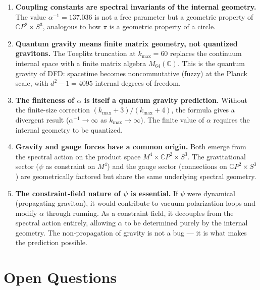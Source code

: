 \documentclass[12pt,a4paper]{article}
\newcommand{\CP}{\mathbb{C}P}
\begin{document}
\begin{enumerate}
\item \textbf{Coupling constants are spectral invariants of the internal geometry.} The value $\alpha^{-1} = 137.036$ is not a free parameter but a geometric property of $\CP^2 \times S^3$, analogous to how $\pi$ is a geometric property of a circle.

\item \textbf{Quantum gravity means finite matrix geometry, not quantized gravitons.} The Toeplitz truncation at $k_{\max} = 60$ replaces the continuum internal space with a finite matrix algebra $M_{64}(\mathbb{C})$. This is the quantum gravity of DFD: spacetime becomes noncommutative (fuzzy) at the Planck scale, with $d^2 - 1 = 4095$ internal degrees of freedom.

\item \textbf{The finiteness of $\alpha$ is itself a quantum gravity prediction.} Without the finite-size correction $(k_{\max}+3)/(k_{\max}+4)$, the formula gives a divergent result ($\alpha^{-1} \to \infty$ as $k_{\max} \to \infty$). The finite value of $\alpha$ requires the internal geometry to be quantized.

\item \textbf{Gravity and gauge forces have a common origin.} Both emerge from the spectral action on the product space $M^4 \times \CP^2 \times S^3$. The gravitational sector ($\psi$ as constraint on $M^4$) and the gauge sector (connections on $\CP^2 \times S^3$) are geometrically factored but share the same underlying spectral geometry.

\item \textbf{The constraint-field nature of $\psi$ is essential.} If $\psi$ were dynamical (propagating graviton), it would contribute to vacuum polarization loops and modify $\alpha$ through running. As a constraint field, it decouples from the spectral action entirely, allowing $\alpha$ to be determined purely by the internal geometry. The non-propagation of gravity is not a bug --- it is what makes the prediction possible.
\end{enumerate}

\section{Open Questions}
\end{document}
